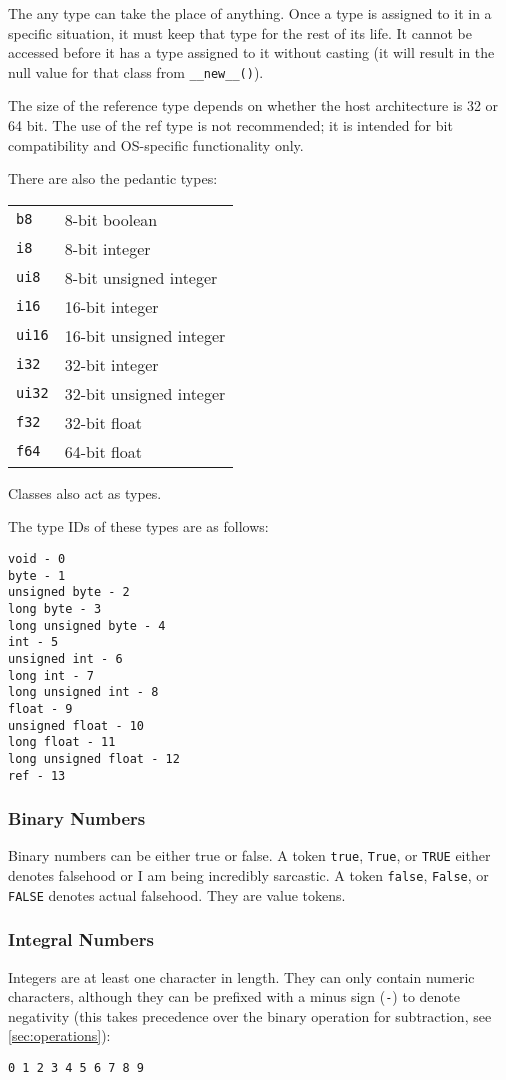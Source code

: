 \documentclass[10pt,a4paper]{article}
\begin{document}
The any type can take the place of anything. Once a type is assigned to it in a specific situation, it must keep that type for the rest of its life. It cannot be accessed before it has a type assigned to it without casting (it will result in the null value for that class from \verb|__new__()|). 

The size of the reference type depends on whether the host architecture is 32 or 64 bit. The use of the ref type is not recommended; it is intended for bit compatibility and OS-specific functionality only. 

There are also the pedantic types:

\begin{tabular}{l l}
\verb|b8| & 8-bit boolean \\
\verb|i8| & 8-bit integer \\
\verb|ui8| & 8-bit unsigned integer \\
\verb|i16| & 16-bit integer \\
\verb|ui16| & 16-bit unsigned integer \\
\verb|i32| & 32-bit integer \\
\verb|ui32| & 32-bit unsigned integer \\
\verb|f32| & 32-bit float \\
\verb|f64| & 64-bit float \\
\end{tabular}

Classes also act as types.

The type IDs of these types are as follows:
\begin{verbatim}
void - 0
byte - 1
unsigned byte - 2
long byte - 3
long unsigned byte - 4
int - 5
unsigned int - 6
long int - 7
long unsigned int - 8
float - 9
unsigned float - 10
long float - 11
long unsigned float - 12
ref - 13
\end{verbatim}

\subsubsection{Binary Numbers}
Binary numbers can be either true or false. A token \verb|true|, \verb|True|, or \verb|TRUE|  either denotes falsehood or I am being incredibly sarcastic. A token \verb|false|, \verb|False|, or \verb|FALSE| denotes actual falsehood. They are value tokens. 

\subsubsection{Integral Numbers}
\label{sec:integers}
Integers are at least one character in length. They can only contain numeric characters, although they can be prefixed with a minus sign (\verb|-|) to denote negativity (this takes precedence over the binary operation for subtraction, see \ref{sec:operations}):
\begin{verbatim}
0 1 2 3 4 5 6 7 8 9
\end{verbatim}
\end{document}
